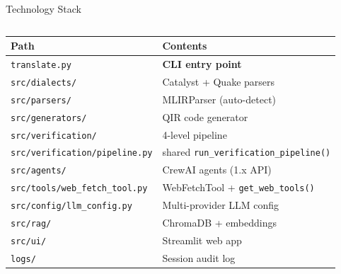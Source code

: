 \documentclass[aspectratio=169,10pt]{beamer}
\begin{document}
\begin{frame}{Technology Stack}
\begin{columns}[T]
      \begin{small}
      \begin{tabular}{@{}ll@{}}
        \toprule
        Path & Contents \\
        \midrule
        \texttt{translate.py} & \textbf{CLI entry point} \\
        \texttt{src/dialects/} & Catalyst + Quake parsers \\
        \texttt{src/parsers/} & MLIRParser (auto-detect) \\
        \texttt{src/generators/} & QIR code generator \\
        \texttt{src/verification/} & 4-level pipeline \\
        \texttt{src/verification/pipeline.py} & shared \texttt{run\_verification\_pipeline()} \\
        \texttt{src/agents/} & CrewAI agents (1.x API) \\
        \texttt{src/tools/web\_fetch\_tool.py} & WebFetchTool + \texttt{get\_web\_tools()} \\
        \texttt{src/config/llm\_config.py} & Multi-provider LLM config \\
        \texttt{src/rag/} & ChromaDB + embeddings \\
        \texttt{src/ui/} & Streamlit web app \\
        \texttt{logs/} & Session audit log \\
        \bottomrule
      \end{tabular}
      \end{small}
  \end{columns}
\end{frame}
\end{document}
